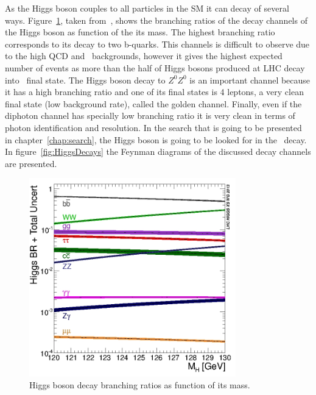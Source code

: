 As the Higgs boson couples to all particles in the SM it can decay of several ways. Figure~\ref{fig:HiggsBrs}, taken from~\cite{Dittmaier:2011ti, Dittmaier:2012vm, Heinemeyer:2013tqa, HIGGSXSWG}, shows the branching ratios of the decay channels of the Higgs boson as function of the its mass. The highest branching ratio corresponds to its decay to two b-quarks. This channels is difficult to observe due to the high QCD and \ttbar~backgrounds, however it gives the highest expected number of events as more than the half of Higgs bosons produced at LHC decay into \bbbar~final state. The Higgs boson decay to $Z^{0}Z^{0}$ is an important channel because it has a high branching ratio and one of its final states is 4 leptons, a very clean final state (low background rate), called the golden channel. Finally, even if the diphoton channel has specially low branching ratio it is very clean in terms of photon identification and resolution. In the search that is going to be presented in chapter~\ref{chap:search}, the Higgs boson is going to be looked for in the \bbbar~decay. In figure~\ref{fig:HiggsDecays} the Feynman diagrams of the discussed decay channels are presented.

\begin{figure}[!Hhtbp]
  \begin{center}
    \includegraphics[width=0.8\textwidth]{figs/Higgs_BR_120-130.jpg}
    \caption{Higgs boson decay branching ratios as function of its mass.}
    \label{fig:HiggsBrs}
  \end{center}
\end{figure}


